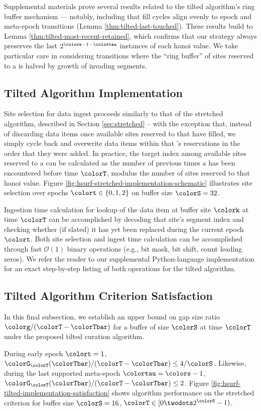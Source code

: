 Supplemental materials prove several results related to the tilted algorithm's ring buffer mechanism --- notably, including that fill cycles align evenly to epoch and meta-epoch transitions (Lemma \ref{thm:tilted-last-touched}).
These results build to Lemma \ref{thm:tilted-most-recent-retained}, which confirms that our strategy always preserves the last $2^{\colors - 1 - \colortau}$ instances of each hanoi value.
We take particular care in considering transitions where the ``ring buffer'' of sites reserved to a \hv{} is halved by growth of invading segments.

\subsection{Tilted Algorithm Implementation}
\label{sec:tilted-implementation}



Site selection for data ingest proceeds similarly to that of the stretched algorithm, described in Section \ref{sec:stretched} -- with the exception that, instead of discarding data items once available sites reserved to that \hv{} have filled, we simply cycle back and overwrite data items within that \hv{}'s reservations in the order that they were added.
In practice, the target index among available sites reserved to a \hv{} can be calculated as the number of previous times a \hv{} has been encountered before time $\colorT$, modulus the number of sites reserved to that hanoi value.
Figure \ref{fig:hsurf-stretched-implementation-schematic} illustrates site selection over epochs $\colort \in \{0,1,2\}$ on buffer size $\colorS=32$.

Ingestion time calculation for lookup of the data item at buffer site $\colork$ at time $\colorT$ can be accomplished by decoding that site's segment index and checking whether (if slated) it has yet been replaced during the current epoch $\colort$.
Both site selection and ingest time calculation can be accomplished through fast $\mathcal{O}(1)$ binary operations (e.g., bit mask, bit shift, count leading zeros).
We refer the reader to our supplemental Python-language implementation for an exact step-by-step listing of both operations for the tilted algorithm.

\subsection{Tilted Algorithm Criterion Satisfaction}
\label{sec:tilted-satisfaction}

In this final subsection, we establish an upper bound on gap size ratio $\colorg/(\colorT - \colorTbar)$ for a buffer of size $\colorS$ at time $\colorT$ under the proposed tilted curation algorithm.



During early epoch $\colort = 1$, $\colorG_{\colorT}(\colorTbar)/(\colorT - \colorTbar) \leq 4/\colorS$.
Likewise, during the last supported meta-epoch $\colortau = \colors - 1$, $\colorG_{\colorT}(\colorTbar)/(\colorT - \colorTbar) \leq 2$.
Figure \ref{fig:hsurf-tilted-implementation-satisfaction} shows algorithm performance on the stretched criterion for buffer size $\colorS=16$, $\colorT \in [0\twodots 2^{\colorS} - 1)$.
